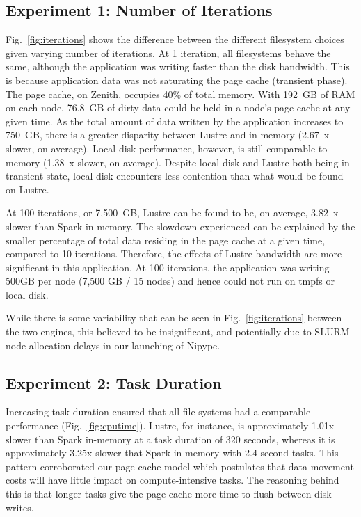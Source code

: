 \subsection{Experiment 1: Number of Iterations}

Fig.~\ref{fig:iterations} shows the difference between the different 
filesystem choices given varying number of iterations. At 1 iteration, all 
filesystems behave the same, although the application was writing faster than the
disk bandwidth. This is because application data was not saturating the page cache
(transient phase). The page cache, on Zenith, occupies 40\% of 
total memory. With 192~GB of RAM on each node, 76.8~GB of 
dirty data could be held in a node's page cache at any given time.
As the total amount of data written by the 
application increases to 750~GB, there is a greater disparity between 
Lustre and in-memory (2.67~x slower, on average). Local disk 
performance, however, 
is still comparable to memory (1.38~x slower, on average). Despite local disk and 
Lustre both being in transient state, local disk encounters less contention 
than what would be found on Lustre. 

At 100 iterations, or 7,500~GB, Lustre can be found to be, on average, 3.82~x 
slower than Spark in-memory. The 
slowdown experienced can be explained by the smaller percentage of total data 
residing in the page cache at a given time, compared to 10 iterations. 
Therefore, the effects of Lustre bandwidth are more significant in 
this application. At 100 iterations, the application was writing 500GB 
per node (7,500 GB / 15 nodes) and hence could not run on tmpfs or local disk.

While there is some variability that can be seen in Fig.~\ref{fig:iterations} 
between the two engines, this believed to be insignificant, and potentially due 
to SLURM node allocation delays in our launching of Nipype.


\subsection{Experiment 2: Task Duration}
%

Increasing task duration ensured that all file systems had a comparable performance
(Fig.~\ref{fig:cputime}). Lustre, for instance, is approximately 1.01x slower
than Spark in-memory at a task duration of 320 seconds, whereas it is 
approximately 3.25x slower that Spark in-memory with 2.4 second tasks. This 
pattern corroborated our page-cache model which postulates that 
data movement costs will have little impact on compute-intensive tasks. The 
reasoning behind this is that longer tasks give the page cache more time to flush 
between disk writes.

